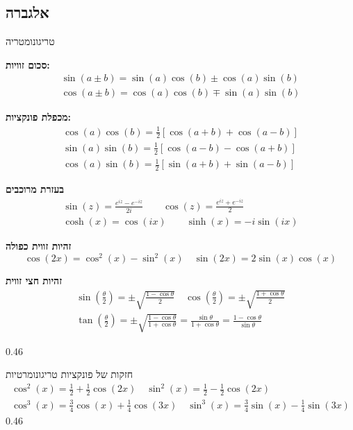 
\subsection*{אלגברה} \unskip
 \begin{mytikzbox}{ טריגונומטריה}{
\textbf{סכום זוויות:}
\begin{gather*}\sin(a\pm b) = \sin(a)\cos(b)\pm \cos(a)\sin(b) \\
\cos(a\pm b)=\cos(a)\cos(b)\mp \sin(a)\sin(b)\end{gather*}

\textbf{מכפלת פונקציות:}
\begin{gather*}\cos(a)\cos(b)=\frac{1}{2}\left[ \cos(a+ b)+\cos(a-b) \right] \\
\sin(a)\sin(b)=\frac{1}{2}[\cos(a- b)-\cos(a+b)] \\
\cos(a)\sin(b)=\frac{1}{2}[\sin(a+ b)+\sin(a-b)]\end{gather*}

\textbf{בעזרת מרוכבים}
\begin{gather*}
    \sin(z) = \frac{e^{iz}-e^{-iz}}{2i}\qquad \cos(z) = \frac{e^{iz}+e^{-iz}}{2}\\
    \cosh(x)=\cos(ix)\qquad \sinh(x)=-i\sin(ix)
\end{gather*}

 \textbf{זהיות זווית כפולה}
$$\cos(2x)=\cos^2 (x) - \sin^2 (x)\quad \sin (2x) = 2\sin (x)\cos(x)$$

\textbf{זהיות חצי זווית}
 \begin{gather*}\sin\left(\frac \theta2\right)=\pm\sqrt{\frac{1-\cos \theta}2}\quad\cos\left(\frac \theta2\right)=\pm\sqrt{\frac{1+\cos \theta}2}\\
 \tan\left(\frac \theta2\right)=\pm\sqrt{\frac{1-\cos \theta}{1+\cos \theta}}=\frac{\sin \theta}{1+\cos \theta}=\frac{1-\cos \theta}{\sin \theta}
 \end{gather*}
 \vspace{-10pt}
}{0.46}
    \end{mytikzbox}
    \begin{mytikzbox}{חזקות של פונקציות טריגונומרטיות}{
    \vspace{-7pt}
\begin{gather*}
\cos^2 (x) = \frac{1}{2} + \frac{1}{2}\cos(2x)\quad \sin^2 (x) = \frac{1}{2} - \frac{1}{2}\cos(2x)
\\
 \cos^3 (x) \!=\! \frac{3}{4}\cos(x)\!+\!\frac{1}{4}\cos(3x)\quad \sin^3 (x) \!=\! \frac{3}{4}\sin(x) \!-\! \frac{1}{4}\sin(3x)
\end{gather*}\vspace{-12pt}
}{0.46}
    \end{mytikzbox}
